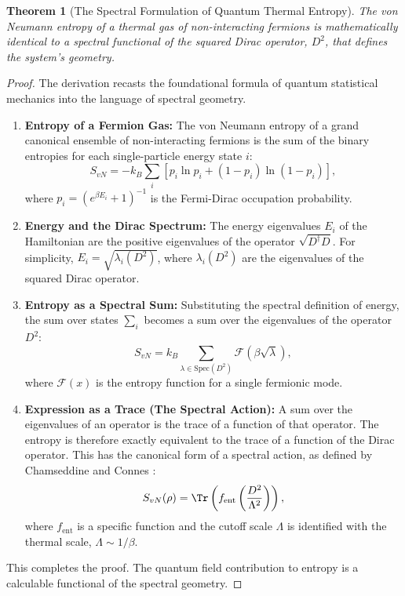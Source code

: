 \documentclass[11pt, letterpaper]{report}
\theoremstyle{plain} %
\newtheorem{theorem}{Theorem}[chapter]
\theoremstyle{definition} %
\theoremstyle{remark} %
\begin{document}
\begin{theorem}[The Spectral Formulation of Quantum Thermal Entropy]
\label{thm:spectral_from_statmech_final_c7}
The von Neumann entropy of a thermal gas of non-interacting fermions is mathematically identical to a spectral functional of the squared Dirac operator, $D^2$, that defines the system's geometry.
\end{theorem}
\begin{proof}
The derivation recasts the foundational formula of quantum statistical mechanics into the language of spectral geometry.
\begin{enumerate}
    \item \textbf{Entropy of a Fermion Gas:} The von Neumann entropy of a grand canonical ensemble of non-interacting fermions is the sum of the binary entropies for each single-particle energy state $i$:
    \begin{equation}
        S_{vN} = -k_B \sum_i \left[ p_i \ln p_i + (1-p_i) \ln(1-p_i) \right],
    \end{equation}
    where $p_i = (e^{\beta E_i} + 1)^{-1}$ is the Fermi-Dirac occupation probability.

    \item \textbf{Energy and the Dirac Spectrum:} The energy eigenvalues $E_i$ of the Hamiltonian are the positive eigenvalues of the operator $\sqrt{D^\dagger D}$. For simplicity, $E_i = \sqrt{\lambda_i(D^2)}$, where $\lambda_i(D^2)$ are the eigenvalues of the squared Dirac operator.

    \item \textbf{Entropy as a Spectral Sum:} Substituting the spectral definition of energy, the sum over states $\sum_i$ becomes a sum over the eigenvalues of the operator $D^2$:
    \begin{equation}
        S_{vN} = k_B \sum_{\lambda \in \text{Spec}(D^2)} \mathcal{F}(\beta\sqrt{\lambda}),
    \end{equation}
    where $\mathcal{F}(x)$ is the entropy function for a single fermionic mode.

    \item \textbf{Expression as a Trace (The Spectral Action):} A sum over the eigenvalues of an operator is the trace of a function of that operator. The entropy is therefore exactly equivalent to the trace of a function of the Dirac operator. This has the canonical form of a spectral action, as defined by Chamseddine and Connes \cite{Chamseddine1997SpectralAction}:
    \begin{equation}
        S_{vN}(\rho) = \Tr\left( f_{\text{ent}}\left(\frac{D^2}{\Lambda^2}\right) \right),
        \label{eq:entropy_as_spectral_action_final_c7}
    \end{equation}
    where $f_{\text{ent}}$ is a specific function and the cutoff scale $\Lambda$ is identified with the thermal scale, $\Lambda \sim 1/\beta$.
\end{enumerate}
This completes the proof. The quantum field contribution to entropy is a calculable functional of the spectral geometry.
\end{proof}
\end{document}
